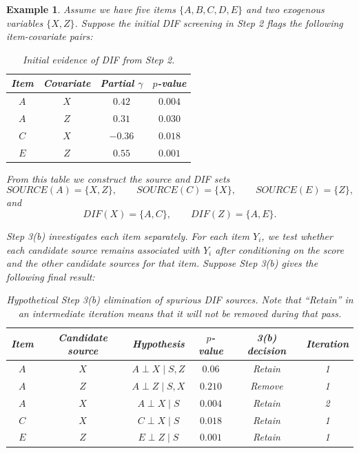 \documentclass[a4project,12pt]{article}
\theoremstyle{examplestyle}
\newtheorem{example}{Example}[section]
\theoremstyle{defstyle}
\theoremstyle{thmstyle}
\begin{document}
\begin{mybox3}
\begin{example}
Assume we have five items $\{A,B,C,D,E\}$ and two exogenous variables
$\{X,Z\}$. Suppose the initial DIF screening in Step 2 flags the following
item-covariate pairs:

\begin{table}[H]
\centering
\begin{tabular}{c c c c}
\hline
Item & Covariate & Partial $\gamma$ & $p$-value \\
\hline
$A$ & $X$ & $0.42$ & $0.004$ \\
$A$ & $Z$ & $0.31$ & $0.030$ \\
$C$ & $X$ & $-0.36$ & $0.018$ \\
$E$ & $Z$ & $0.55$ & $0.001$ \\
\hline
\end{tabular}
\caption{Initial evidence of DIF from Step 2.}
\label{tab:step3_example_initial}
\end{table}

From this table we construct the source and DIF sets
\[
SOURCE(A)=\{X,Z\}, \qquad SOURCE(C)=\{X\}, \qquad SOURCE(E)=\{Z\},
\]
and
\[
DIF(X)=\{A,C\}, \qquad DIF(Z)=\{A,E\}.
\]

Step 3(b) investigates each item separately. For each item $Y_i$, we test
whether each candidate source remains associated with $Y_i$ after conditioning
on the score and the other candidate sources for that item. Suppose Step 3(b)
gives the following final result:

\begin{table}[H]
\centering
\begin{tabular}{c c c c c c}
\hline
Item & Candidate source & Hypothesis & $p$-value & 3(b) decision & Iteration \\
\hline
$A$ & $X$ & $A \perp X \mid S, Z$ & $0.06$ & Retain & 1\\
$A$ & $Z$ & $A \perp Z \mid S,X$ & $0.210$ & Remove & 1\\
$A$ & $X$ & $A \perp X \mid S$ & $0.004$ & Retain & 2\\
$C$ & $X$ & $C \perp X \mid S$ & $0.018$ & Retain & 1\\
$E$ & $Z$ & $E \perp Z \mid S$ & $0.001$ & Retain & 1\\
\hline
\end{tabular}
\caption{Hypothetical Step 3(b) elimination of spurious DIF sources. Note that “Retain” in an intermediate iteration means that it will not be removed during that pass.}
\label{tab:step3_example_3b}
\end{table}


\end{example}
\end{mybox3}
\end{document}
